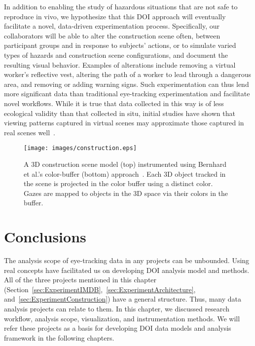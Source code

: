 In addition to enabling the study of hazardous situations that are not safe to reproduce in vivo, we hypothesize that this DOI approach will eventually facilitate a novel, data-driven experimentation process. Specifically, our collaborators will be able to alter the construction scene often, between participant groups and in response to subjects' actions, or to simulate varied types of hazards and construction scene configurations, and document the resulting visual behavior. Examples of alterations include removing a virtual worker's reflective vest, altering the path of a worker to lead through a dangerous area, and removing or adding warning signs. Such experimentation can thus lend more significant data than traditional eye-tracking experimentation and facilitate novel workflows. While it is true that data collected in this way is of less ecological validity than that collected in situ, initial studies have shown that viewing patterns captured in virtual scenes may approximate those captured in real scenes well~\cite{nipesh}.

\begin{figure}[htbp]
  \centering
  \texttt{[image: images/construction.eps]}
  \caption{A 3D construction scene model (top) instrumented using Bernhard et al.'s color-buffer (bottom) approach~\cite{Bern14}. Each 3D object tracked in the scene is projected in the color buffer using a distinct color. Gazes are mapped to objects in the 3D space via their colors in the buffer.}
	\label{fig:construction}
\end{figure}

\section{Conclusions}
The analysis scope of eye-tracking data in any projects can be unbounded. Using real concepts have facilitated us on developing DOI analysis model and methods. All of the three projects mentioned in this chapter (Section~\ref{sec:ExperimentIMDB},~\ref{sec:ExperimentArchitecture}, and~\ref{sec:ExperimentConstruction}) have a general structure. Thus, many data analysis projects can relate to them. In this chapter, we discussed research workflow, analysis scope, visualization, and instrumentation methods. We will refer these projects as a basis for developing DOI data models and analysis framework in the following chapters. 
